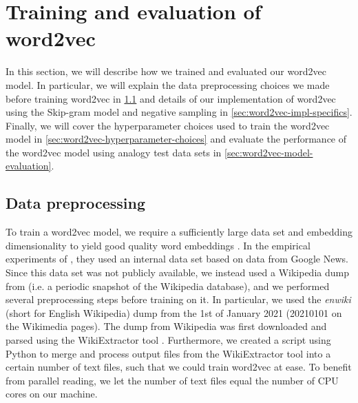 \section{Training and evaluation of word2vec}
\label{sec:training-and-eval-our-word2vec-impl}
In this section, we will describe how we trained and evaluated our word2vec model. In particular, we will explain the data preprocessing choices we made before training word2vec in \cref{sec:word2vec-data-preprocessing} and details of our implementation of word2vec using the Skip-gram model and negative sampling in \cref{sec:word2vec-impl-specifics}. Finally, we will cover the hyperparameter choices used to train the word2vec model in \cref{sec:word2vec-hyperparameter-choices} and evaluate the performance of the word2vec model using analogy test data sets in \cref{sec:word2vec-model-evaluation}.

\subsection{Data preprocessing}
\label{sec:word2vec-data-preprocessing}
To train a word2vec model, we require a sufficiently large data set and embedding dimensionality to yield good quality word embeddings \cite{mikolov2013b}. In the empirical experiments of \cite{mikolov2013b}, they used an internal data set based on data from Google News. Since this data set was not publicly available, we instead used a Wikipedia dump from \cite{WikimediaDumps} (i.e. a periodic snapshot of the Wikipedia database), and we performed several preprocessing steps before training on it. In particular, we used the \textit{enwiki} (short for English Wikipedia) dump from the 1st of January 2021 (20210101 on the Wikimedia pages). The dump from Wikipedia was first downloaded and parsed using the WikiExtractor tool \cite{Wikiextractor2015}. Furthermore, we created a script using Python to merge and process output files from the WikiExtractor tool into a certain number of text files, such that we could train word2vec at ease. To benefit from parallel reading, we let the number of text files equal the number of CPU cores on our machine.

